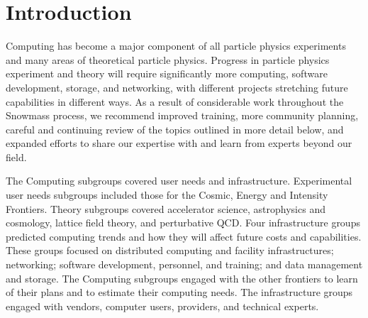 

\section{Introduction}

Computing has become a major component of all particle physics experiments
and many areas of theoretical particle physics. 
Progress in particle physics experiment and theory will require significantly more
computing, software development, storage, and networking, with different
projects stretching future capabilities in different ways.  
As a result of considerable work throughout the Snowmass process, we
recommend improved training, more community planning, careful and continuing 
review of the topics outlined in more detail below, and expanded efforts 
to share our expertise with and learn from experts beyond our field.

The Computing 
subgroups covered user needs and infrastructure.
Experimental user needs subgroups included those for
the Cosmic, Energy and Intensity Frontiers.
Theory subgroups covered accelerator science,
astrophysics and cosmology, lattice field theory, and perturbative QCD.
Four infrastructure groups predicted computing trends and
how they will affect future costs and
capabilities. These groups focused on distributed computing and facility
infrastructures; networking; software development, personnel, and training; and
data management and storage. 
The Computing
subgroups engaged with the other frontiers to learn of
their plans and to estimate their computing needs.  The infrastructure groups
engaged with vendors, computer users, providers, and technical experts. 

